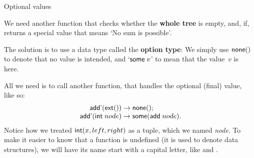 %
\begin{frame}{Optional values}

  We need another function that checks whether the \textbf{whole tree}
  is empty, and, if, returns a special value that means `No sum is
  possible'.

  \bigskip

  The solution is to use a data type called the \textbf{option type}:
  We simply use $\textsf{none}()$ to denote that no value is intended,
  and `$\textsf{some} \; v$' to mean that the value~$v$ is here.

  \bigskip

  All we need is to call another function,  that handles the
  optional (final) value, like so:
  \begin{equation*}
    \begin{array}{r@{\;}l@{\;}l@{}}
      \fun{add'}(\fun{ext}()) & \rightarrow & \fun{none}();\\
      \fun{add'}(\fun{int} \; node) & \rightarrow & \fun{some} (\fun{add} \; node).
    \end{array}
  \end{equation*}
  Notice how we treated $\textsf{int}(x, left, right)$ as a tuple, which
  we named \emph{node}. To make it easier to know that a function is
  undefined (it is used to denote data structures), we will have its
  name start with a capital letter, like  and .

\end{frame}
